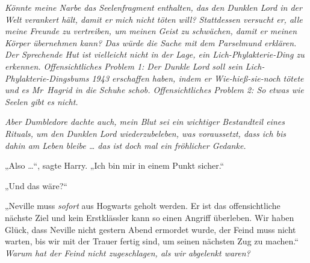 \emph{Könnte meine \emph{Narbe} das Seelenfragment enthalten, das den Dunklen Lord in der Welt verankert hält, damit er mich nicht töten will? Stattdessen versucht er, alle meine Freunde zu vertreiben, um meinen Geist zu schwächen, damit er meinen Körper übernehmen kann? Das würde die Sache mit dem Parselmund erklären. Der Sprechende Hut ist vielleicht nicht in der Lage, ein Lich-Phylakterie-Ding zu erkennen. Offensichtliches Problem 1: Der Dunkle Lord soll sein Lich-Phylakterie-Dingsbums 1943 erschaffen haben, indem er Wie-hieß-sie-noch tötete und es Mr~Hagrid in die Schuhe schob. Offensichtliches Problem 2: So etwas wie Seelen gibt es nicht.}

\emph{Aber Dumbledore dachte auch, mein Blut sei ein wichtiger Bestandteil eines Rituals, um den Dunklen Lord wiederzubeleben, was voraussetzt, dass ich bis dahin am Leben bleibe … das ist doch mal ein fröhlicher Gedanke.}

„Also …“, sagte Harry.
„Ich bin mir in einem Punkt sicher.“

„Und das wäre?“

„Neville muss \emph{sofort} aus Hogwarts geholt werden. Er ist das offensichtliche nächste Ziel und kein Erstklässler kann so einen Angriff überleben. Wir haben Glück, dass Neville nicht gestern Abend ermordet wurde, der Feind muss nicht warten, bis wir mit der Trauer fertig sind, um seinen nächsten Zug zu machen.“ \emph{Warum hat der Feind nicht zugeschlagen, als wir abgelenkt waren?}

